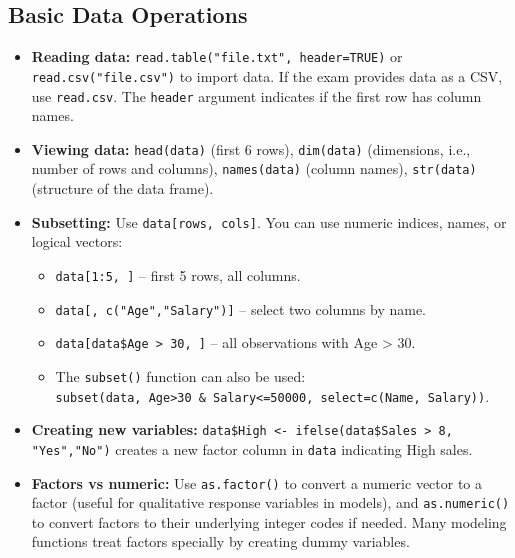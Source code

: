 \documentclass[11pt]{article}
\begin{document}
\subsection{Basic Data Operations}
\begin{itemize}
    \item \textbf{Reading data:} \verb|read.table("file.txt", header=TRUE)| or \verb|read.csv("file.csv")| to import data. If the exam provides data as a CSV, use \texttt{read.csv}. The \texttt{header} argument indicates if the first row has column names.
    
    \item \textbf{Viewing data:} \verb|head(data)| (first 6 rows), \verb|dim(data)| (dimensions, i.e., number of rows and columns), \verb|names(data)| (column names), \verb|str(data)| (structure of the data frame).
    
    \item \textbf{Subsetting:} Use \verb|data[rows, cols]|. You can use numeric indices, names, or logical vectors:
    \begin{itemize}
        \item \verb|data[1:5, ]| – first 5 rows, all columns.
        \item \verb|data[, c("Age","Salary")]| – select two columns by name.
        \item \verb|data[data$Age > 30, ]| – all observations with Age > 30.
        \item The \texttt{subset()} function can also be used: \\
        \verb|subset(data, Age>30 & Salary<=50000, select=c(Name, Salary))|.
    \end{itemize}
    
    \item \textbf{Creating new variables:} \verb|data$High <- ifelse(data$Sales > 8, "Yes","No")| creates a new factor column in \texttt{data} indicating High sales.
    
    \item \textbf{Factors vs numeric:} Use \verb|as.factor()| to convert a numeric vector to a factor (useful for qualitative response variables in models), and \verb|as.numeric()| to convert factors to their underlying integer codes if needed. Many modeling functions treat factors specially by creating dummy variables.
\end{itemize}
\end{document}
